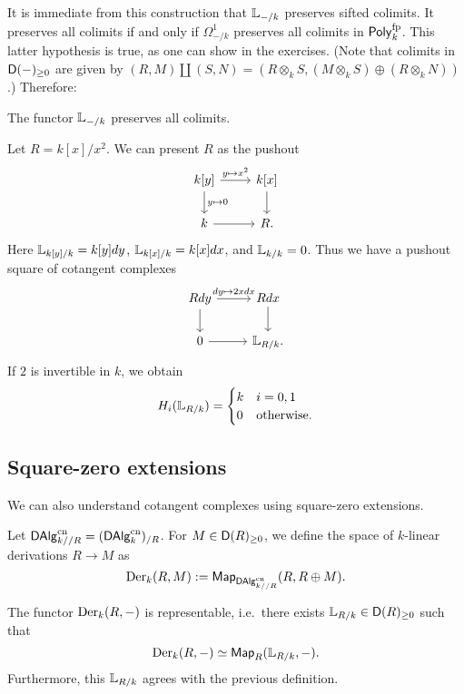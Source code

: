 \documentclass{amsart}
\begin{document}
It is immediate from this construction that $\mathbb{L}_{-/k}$ preserves sifted colimits.
It preserves all colimits if and only if $\Omega^1_{-/k}$ preserves all colimits in $\mathsf{Poly}^{\mathrm{fp}}_k$.
This latter hypothesis is true, as one can show in the exercises.
(Note that colimits in $\mathsf{D}(-)_{\geq 0}$ are given by $(R, M) \coprod (S, N) = (R \otimes_k S, (M \otimes_k S) \oplus (R \otimes_k N))$.)
Therefore:

\begin{prop}
	The functor $\mathbb{L}_{-/k}$ preserves all colimits.
\end{prop}

\begin{ex}
	Let $R = k[x] / x^2$.
	We can present $R$ as the pushout
	\[
		\begin{tikzcd}
			k[y] \rar["y \mapsto x^2"] \dar["y \mapsto 0"] & k[x] \dar \\
			k \rar & R.
		\end{tikzcd}
	\]
	Here $\mathbb{L}_{k[y]/k} = k[y] dy$, $\mathbb{L}_{k[x]/k} = k[x] dx$, and $\mathbb{L}_{k/k} = 0$.
	Thus we have a pushout square of cotangent complexes
	\[
		\begin{tikzcd}
			R dy \rar["dy \mapsto 2x dx"] \dar & R dx \dar \\
			0 \rar & \LL_{R/k}.
		\end{tikzcd}
	\]
	If $2$ is invertible in $k$, we obtain
	\[
		H_i(\mathbb{L}_{R/k}) = \begin{cases}
			k & i = 0, 1 \\
			0 & \textrm{otherwise.}
		\end{cases}
	\]
\end{ex}

\subsection{Square-zero extensions}

We can also understand cotangent complexes using square-zero extensions.

Let $\mathsf{DAlg}_{k//R}^{\mathrm{cn}} = (\mathsf{DAlg}_k^{\mathrm{cn}})_{/R}$.
For $M \in \mathsf{D}(R)_{\geq 0}$, we define the space of $k$-linear derivations $R \to M$ as
\[
	\operatorname{Der}_k(R, M) := \mathsf{Map}_{\mathsf{DAlg}_{k//R}^{\mathrm{cn}}}(R, R \oplus M).
\]

\begin{prop}
	The functor $\operatorname{Der}_k(R, -)$ is representable, i.e.\ there exists $\mathbb{L}_{R/k} \in \mathsf{D}(R)_{\geq 0}$ such that
	\[
		\operatorname{Der}_k(R, -) \simeq \mathsf{Map}_R(\mathbb{L}_{R/k}, -).
	\]
	Furthermore, this $\mathbb{L}_{R/k}$ agrees with the previous definition.
\end{prop}
\end{document}
